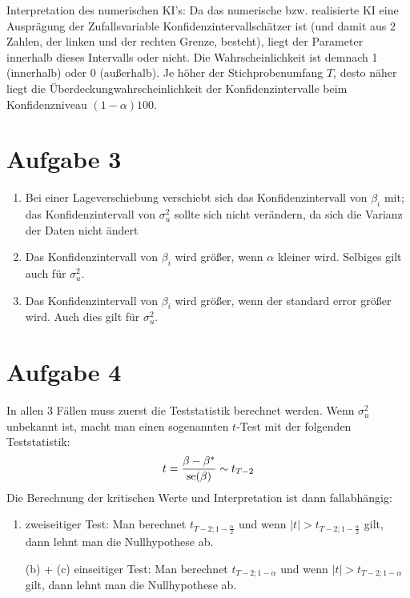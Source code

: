 \documentclass{article}
\begin{document}
	Interpretation des numerischen KI's: Da das numerische bzw. realisierte KI eine Ausprägung der Zufallsvariable Konfidenzintervallschätzer ist (und damit aus 2 Zahlen, der linken und der rechten Grenze, besteht), liegt der Parameter innerhalb dieses Intervalls oder nicht. Die Wahrscheinlichkeit ist demnach 1 (innerhalb) oder 0 (außerhalb). Je höher der Stichprobenumfang $T$, desto näher liegt die Überdeckungwahrscheinlichkeit der Konfidenzintervalle beim Konfidenzniveau $(1-\alpha)100$.
	
	\section*{Aufgabe 3}
	\begin{enumerate}[label=(\alph*)]
		\item Bei einer Lageverschiebung verschiebt sich das Konfidenzintervall von $\beta_i$ mit; das Konfidenzintervall von $\sigma^2_u$ sollte sich nicht verändern, da sich die Varianz der Daten nicht ändert
		\item Das Konfidenzintervall von $\beta_i$ wird größer, wenn $\alpha$ kleiner wird. Selbiges gilt auch für $\sigma^2_u$.
		\item Das Konfidenzintervall von $\beta_i$ wird größer, wenn der standard error größer wird. Auch dies gilt für $\sigma^2_u$.
	\end{enumerate}

	\section*{Aufgabe 4}
	In allen 3 Fällen muss zuerst die Teststatistik berechnet werden. Wenn $\sigma^2_u$ unbekannt ist, macht man einen sogenannten $t$-Test mit der folgenden Teststatistik:
	\begin{align}
		t = \frac{\beta - \beta^\ast}{\text{se}(\beta)} \sim t_{T-2} \notag
	\end{align}
	Die Berechnung der kritischen Werte und Interpretation ist dann fallabhängig:
	\begin{enumerate}[label=(\alph*)]
		\item zweiseitiger Test: Man berechnet $t_{T-2;1-\frac{\alpha}{2}}$ und wenn $\vert t\vert > t_{T-2;1-\frac{\alpha}{2}}$ gilt, dann lehnt man die Nullhypothese ab.
		\item[(b) + (c)] einseitiger Test: Man berechnet $t_{T-2;1-\alpha}$ und wenn $\vert t\vert > t_{T-2;1-\alpha}$ gilt, dann lehnt man die Nullhypothese ab.
	\end{enumerate}
\end{document}
